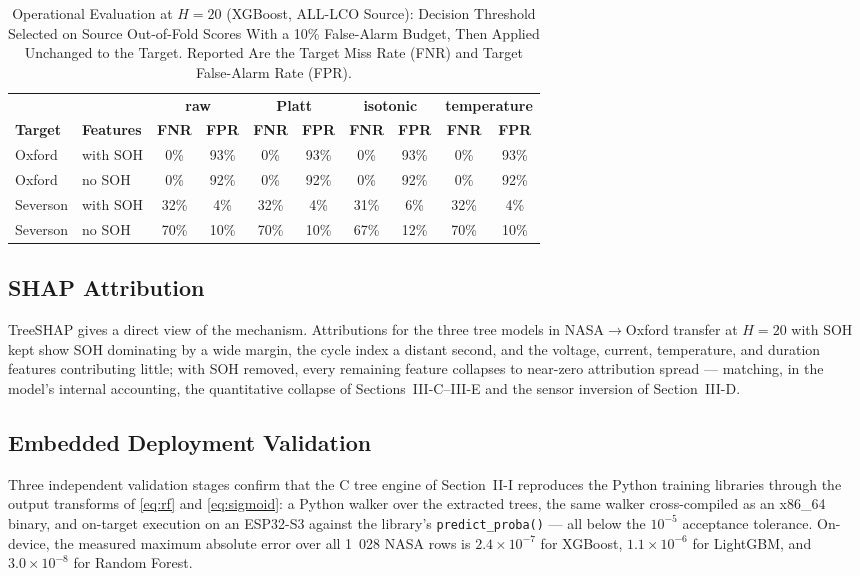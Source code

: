 \documentclass[11pt,a4paper]{article}
\begin{document}
\begin{table}[!t]
\caption{Operational Evaluation at $H{=}20$ (XGBoost, ALL-LCO Source): Decision Threshold Selected on Source Out-of-Fold Scores With a 10\% False-Alarm Budget, Then Applied Unchanged to the Target. Reported Are the Target Miss Rate (FNR) and Target False-Alarm Rate (FPR).}
\label{tab:oper}
\centering
\scriptsize
\setlength{\tabcolsep}{2.5pt}
\begin{tabular}{llcccccccc}
\toprule
 & & \multicolumn{2}{c}{\textbf{raw}} & \multicolumn{2}{c}{\textbf{Platt}} & \multicolumn{2}{c}{\textbf{isotonic}} & \multicolumn{2}{c}{\textbf{temperature}}\\
\cmidrule(lr){3-4}\cmidrule(l){5-6}\cmidrule(l){7-8}\cmidrule(l){9-10}
\textbf{Target} & \textbf{Features} & \textbf{FNR} & \textbf{FPR} & \textbf{FNR} & \textbf{FPR} & \textbf{FNR} & \textbf{FPR} & \textbf{FNR} & \textbf{FPR}\\
\midrule
Oxford & with SOH & 0\% & 93\% & 0\% & 93\% & 0\% & 93\% & 0\% & 93\% \\
Oxford & no SOH & 0\% & 92\% & 0\% & 92\% & 0\% & 92\% & 0\% & 92\% \\
Severson & with SOH & 32\% & 4\% & 32\% & 4\% & 31\% & 6\% & 32\% & 4\% \\
Severson & no SOH & 70\% & 10\% & 70\% & 10\% & 67\% & 12\% & 70\% & 10\% \\
\bottomrule
\end{tabular}
\end{table}

\subsection{SHAP Attribution}
TreeSHAP \cite{lundberg2020from} gives a direct view of the mechanism. Attributions for the three tree models in NASA$\to$Oxford transfer at $H{=}20$ with SOH kept show SOH dominating by a wide margin, the cycle index a distant second, and the voltage, current, temperature, and duration features contributing little; with SOH removed, every remaining feature collapses to near-zero attribution spread --- matching, in the model's internal accounting, the quantitative collapse of Sections~III-C--III-E and the sensor inversion of Section~III-D.

\subsection{Embedded Deployment Validation}
Three independent validation stages confirm that the C tree engine of Section~II-I reproduces the Python training libraries through the output transforms of \eqref{eq:rf} and \eqref{eq:sigmoid}: a Python walker over the extracted trees, the same walker cross-compiled as an x86\_64 binary, and on-target execution on an ESP32-S3 against the library's \texttt{predict\_proba()} --- all below the $10^{-5}$ acceptance tolerance. On-device, the measured maximum absolute error over all 1~028 NASA rows is $2.4\times10^{-7}$ for XGBoost, $1.1\times10^{-6}$ for LightGBM, and $3.0\times10^{-8}$ for Random Forest.
\end{document}
